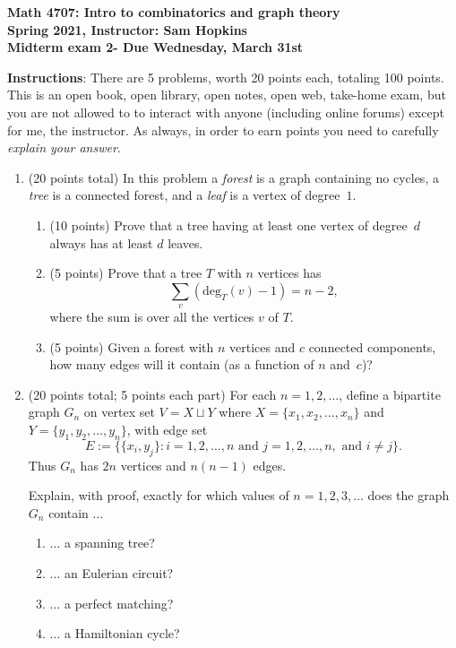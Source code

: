 \documentclass[11pt]{article}
\begin{document}
\begin{center}
{\bf Math 4707: Intro to combinatorics and graph theory \\
Spring 2021, Instructor: Sam Hopkins \\
Midterm exam 2- Due Wednesday, March 31st}
\end{center}

{\bf Instructions}: There are 5 problems, worth 20 points each, totaling 100 points. This is an open book, open library, open notes, open web, take-home exam, but you are not allowed to to interact with anyone (including online forums) except for me, the instructor. As always, in order to earn points you need to carefully \emph{explain your answer}.

\begin{enumerate}

\item (20 points total) In this problem a \emph{forest} is a graph containing no cycles, a \emph{tree} is a connected forest, and a \emph{leaf} is a vertex of degree~$1$. 
\begin{enumerate} 
\item (10 points) Prove that a tree having at least one vertex of degree~$d$ always has at least $d$ leaves. 
\item (5 points) Prove that a tree $T$ with $n$ vertices has \[ \sum_{v} (\mathrm{deg}_T(v)-1)=n-2,\] where the sum is over all the vertices $v$ of $T$. 
\item (5 points) Given a forest with $n$ vertices and $c$ connected components, how many edges will it contain (as a function of $n$ and~$c$)? \end{enumerate}

\item (20 points total; 5 points each part) For each $n=1,2,\ldots$, define a bipartite graph $G_n$ on vertex set $V=X\sqcup Y$ where $X = \{x_1,x_2,\ldots,x_n\}$ and $Y = \{y_1,y_2,\ldots,y_n\}$, with edge set
\[ E := \{\{x_i,y_j\}\colon i = 1,2,\ldots, n \textrm{ and } j=1,2,\ldots,n, \textrm{ and } i\neq j \}.\]
Thus $G_n$ has $2n$ vertices and $n(n-1)$ edges.

Explain, with proof, exactly for which values of $n=1,2,3,\ldots$ does the graph $G_n$ contain $\ldots$ 
\begin{enumerate} \item $\ldots$ a spanning tree? 
\item $\ldots$ an Eulerian circuit? 
\item $\ldots$ a perfect matching? 
\item $\ldots$ a Hamiltonian cycle? \end{enumerate}


\end{enumerate}
\end{document}
